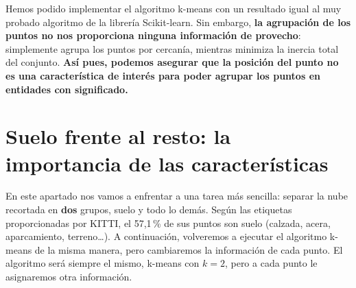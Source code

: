 \documentclass{article}
\begin{document}
Hemos podido implementar el algoritmo k-means con un resultado igual al muy probado algoritmo de la librería Scikit-learn. Sin embargo, \textbf{la agrupación de los puntos no nos proporciona ninguna información de provecho}: simplemente agrupa los puntos por cercanía, mientras minimiza la inercia total del conjunto. \textbf{Así pues, podemos asegurar que la posición del punto no es una característica de interés para poder agrupar los puntos en entidades con significado.
}


\section{Suelo frente al resto: la importancia de las características}
En este apartado nos vamos a enfrentar a una tarea más sencilla: separar la nube recortada en \textbf{dos} grupos, suelo y todo lo demás. Según las etiquetas proporcionadas por KITTI, el 57{,}1\,\% de sus puntos son suelo (calzada, acera, aparcamiento, terreno\dots). A continuación, volveremos a ejecutar el algoritmo k-means de la misma manera, pero cambiaremos la información de cada punto. El algoritmo será siempre el mismo, k-means con $k = 2$, pero a cada punto le asignaremos otra información.
\end{document}
